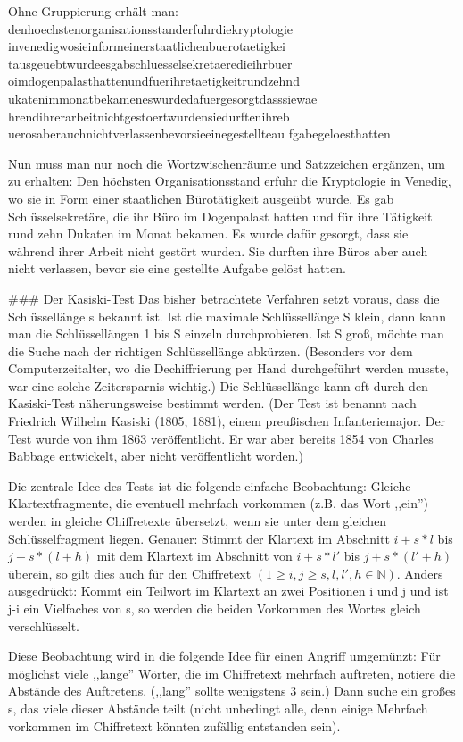 \documentclass[a4paper]{article}
\begin{document}
\begin{multicols}{3}
        Ohne Gruppierung erhält man:
        denhoechstenorganisationsstanderfuhrdiekryptologie
        invenedigwosieinformeinerstaatlichenbuerotaetigkei
        tausgeuebtwurdeesgabschluesselsekretaeredieihrbuer
        oimdogenpalasthattenundfuerihretaetigkeitrundzehnd
        ukatenimmonatbekameneswurdedafuergesorgtdasssiewae
        hrendihrerarbeitnichtgestoertwurdensiedurftenihreb
        uerosaberauchnichtverlassenbevorsieeinegestellteau
        fgabegeloesthatten

        Nun muss man nur noch die Wortzwischenräume und Satzzeichen ergänzen, um zu erhalten:
        Den höchsten Organisationsstand erfuhr die Kryptologie in Venedig, wo sie in Form einer staatlichen Bürotätigkeit ausgeübt wurde. Es gab Schlüsselsekretäre, die ihr Büro im Dogenpalast hatten und für ihre Tätigkeit rund zehn Dukaten im Monat bekamen. Es wurde dafür gesorgt, dass sie während ihrer Arbeit nicht gestört wurden. Sie durften ihre Büros aber auch nicht verlassen, bevor sie eine gestellte Aufgabe gelöst hatten.

        ### Der Kasiski-Test
        Das bisher betrachtete Verfahren setzt voraus, dass die Schlüssellänge s bekannt ist. Ist die maximale Schlüssellänge S klein, dann kann man die Schlüssellängen 1 bis S einzeln durchprobieren. Ist S groß, möchte man die Suche nach der richtigen Schlüssellänge abkürzen. (Besonders vor dem Computerzeitalter, wo die Dechiffrierung per Hand durchgeführt werden musste, war eine solche Zeitersparnis wichtig.) Die Schlüssellänge kann oft durch den Kasiski-Test näherungsweise bestimmt werden. (Der Test ist benannt nach Friedrich Wilhelm Kasiski (1805, 1881), einem preußischen Infanteriemajor. Der Test wurde von ihm 1863 veröffentlicht. Er war aber bereits 1854 von Charles Babbage entwickelt, aber nicht veröffentlicht worden.)

        Die zentrale Idee des Tests ist die folgende einfache Beobachtung: Gleiche Klartextfragmente, die eventuell mehrfach vorkommen (z.B. das Wort ,,ein'') werden in gleiche Chiffretexte übersetzt, wenn sie unter dem gleichen Schlüsselfragment liegen. Genauer: Stimmt der Klartext im Abschnitt $i+s*l$ bis $j+s*(l+h)$ mit dem Klartext im Abschnitt von $i+s*l′$ bis $j+s*(l′+h)$ überein, so gilt dies auch für den Chiffretext $(1\geq i,j\geq s,l,l′,h\in\mathbb{N})$.
        Anders ausgedrückt: Kommt ein Teilwort im Klartext an zwei Positionen i und j und ist j-i ein Vielfaches von s, so werden die beiden Vorkommen des Wortes gleich verschlüsselt.

        Diese Beobachtung wird in die folgende Idee für einen Angriff umgemünzt: Für möglichst viele ,,lange'' Wörter, die im Chiffretext mehrfach auftreten, notiere die Abstände des Auftretens. (,,lang'' sollte wenigstens 3 sein.) Dann suche ein großes s, das viele dieser Abstände teilt (nicht unbedingt alle, denn einige Mehrfach vorkommen im Chiffretext könnten zufällig entstanden sein).


\end{multicols}
\end{document}
